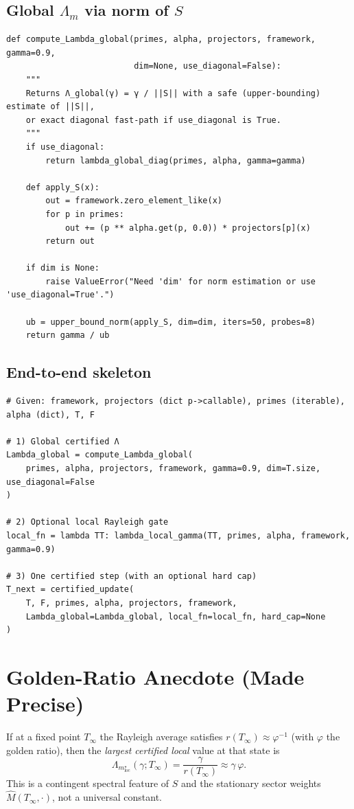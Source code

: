 \documentclass[11pt]{article}
\theoremstyle{definition}
\newcommand{\Mhat}{\widehat{M}}
\newcommand{\Lm}{\Lambda_m}
\begin{document}
\subsection{Global $\Lm$ via norm of $S$}
\begin{lstlisting}[style=py,caption={Global Λ via induced norm (one-sided upper bound)},label={lst:global}]
def compute_Lambda_global(primes, alpha, projectors, framework, gamma=0.9,
                          dim=None, use_diagonal=False):
    """
    Returns Λ_global(γ) = γ / ||S|| with a safe (upper-bounding) estimate of ||S||,
    or exact diagonal fast-path if use_diagonal is True.
    """
    if use_diagonal:
        return lambda_global_diag(primes, alpha, gamma=gamma)

    def apply_S(x):
        out = framework.zero_element_like(x)
        for p in primes:
            out += (p ** alpha.get(p, 0.0)) * projectors[p](x)
        return out

    if dim is None:
        raise ValueError("Need 'dim' for norm estimation or use 'use_diagonal=True'.")

    ub = upper_bound_norm(apply_S, dim=dim, iters=50, probes=8)
    return gamma / ub
\end{lstlisting}

\subsection{End-to-end skeleton}
\begin{lstlisting}[style=py,caption={Minimal end-to-end usage},label={lst:e2e}]
# Given: framework, projectors (dict p->callable), primes (iterable), alpha (dict), T, F

# 1) Global certified Λ
Lambda_global = compute_Lambda_global(
    primes, alpha, projectors, framework, gamma=0.9, dim=T.size, use_diagonal=False
)

# 2) Optional local Rayleigh gate
local_fn = lambda TT: lambda_local_gamma(TT, primes, alpha, framework, gamma=0.9)

# 3) One certified step (with an optional hard cap)
T_next = certified_update(
    T, F, primes, alpha, projectors, framework,
    Lambda_global=Lambda_global, local_fn=local_fn, hard_cap=None
)
\end{lstlisting}

\section{Golden-Ratio Anecdote (Made Precise)}
If at a fixed point $T_\infty$ the Rayleigh average satisfies $r(T_\infty)\approx\varphi^{-1}$ (with $\varphi$ the golden ratio), then the \emph{largest certified local} value at that state is
\[
\Lm_{\mathrm{loc}}^{\star}(\gamma;T_\infty)=\frac{\gamma}{r(T_\infty)}\approx \gamma\,\varphi.
\]
This is a contingent spectral feature of $S$ and the stationary sector weights $\Mhat(T_\infty,\cdot)$, not a universal constant.
\end{document}
